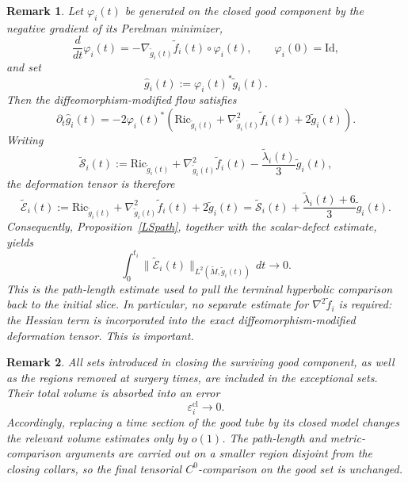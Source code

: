 \documentclass{amsart}
\newtheorem{remark}{Remark}
\begin{document}
\begin{remark}
\label{rem:entropy-gauge-good-tube}
Let \(\varphi_i(t)\) be generated on the closed good component by the
negative gradient of its Perelman minimizer,
\[
        \frac{d}{dt}\varphi_i(t)
        =
        -\nabla_{\widetilde g_i(t)}
        \widetilde f_i(t)\circ\varphi_i(t),
        \qquad
        \varphi_i(0)=\text{Id},
\]
and set
\[
        \widehat g_i(t)
        :=
        \varphi_i(t)^*\widetilde g_i(t).
\]
Then the diffeomorphism-modified flow satisfies
\[
        \partial_t\widehat g_i(t)
        =
        -2\varphi_i(t)^*
        \left(
        \text{Ric}_{\widetilde g_i(t)}
        +
        \nabla^2_{\widetilde g_i(t)}\widetilde f_i(t)
        +
        2\widetilde g_i(t)
        \right).
\]
Writing
\[
        \widetilde{\mathcal S}_i(t)
        :=
        \text{Ric}_{\widetilde g_i(t)}
        +
        \nabla^2_{\widetilde g_i(t)}\widetilde f_i(t)
        -
        \frac{\widetilde\lambda_i(t)}{3}
        \widetilde g_i(t),
\]
the deformation tensor is therefore
\[
        \widetilde{\mathcal E}_i(t)
        :=
        \text{Ric}_{\widetilde g_i(t)}
        +
        \nabla^2_{\widetilde g_i(t)}\widetilde f_i(t)
        +
        2\widetilde g_i(t)
        =
        \widetilde{\mathcal S}_i(t)
        +
        \frac{\widetilde\lambda_i(t)+6}{3}
        \widetilde g_i(t).
\]
Consequently, Proposition~\ref{LSpath}, together with the scalar-defect
estimate, yields
\[
        \int_0^{t_i}
        \|\widetilde{\mathcal E}_i(t)\|
        _{L^2(\widetilde M,\widetilde g_i(t))}
        \,dt
        \longrightarrow0.
\]
This is the path-length estimate used to pull the terminal hyperbolic
comparison back to the initial slice.  In particular, no separate
estimate for
\(\nabla^2\widetilde f_i\)
is required: the Hessian term is incorporated into the exact
diffeomorphism-modified deformation tensor. This is important.
\end{remark}

\begin{remark}
\label{rem:closing-volume-error}
All sets introduced in closing the surviving good component, as well as
the regions removed at surgery times, are included in the exceptional
sets.  Their total volume is absorbed into an error
\[
        \varepsilon_i^{\mathrm{cl}}\longrightarrow0.
\]
Accordingly, replacing a time section of the good tube by its closed
model changes the relevant volume estimates only by
\(o(1)\).  The path-length and metric-comparison arguments are carried
out on a smaller region disjoint from the closing collars, so
the final tensorial \(C^0\)-comparison on the good set is unchanged.
\end{remark}
\end{document}
